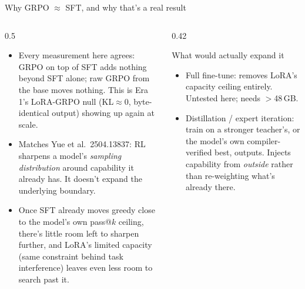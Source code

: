 \documentclass[aspectratio=169,10pt]{beamer}
\begin{document}
\begin{frame}{Why GRPO $\approx$ SFT, and why that's a real result}
  \begin{columns}[T]
    \begin{column}{0.5\textwidth}
      \small
      \begin{itemize}\itemsep0.6em
        \item Every measurement here agrees: GRPO on top of SFT adds nothing beyond SFT alone; raw GRPO from the base moves nothing. This is Era 1's LoRA-GRPO null (KL$\approx$0, byte-identical output) showing up again at scale.
        \item Matches Yue et al.\ 2504.13837: RL sharpens a model's \emph{sampling distribution} around capability it already has. It doesn't expand the underlying boundary.
        \item Once SFT already moves greedy close to the model's own pass@$k$ ceiling, there's little room left to sharpen further, and LoRA's limited capacity (same constraint behind task interference) leaves even less room to search past it.
      \end{itemize}
    \end{column}
    \begin{column}{0.42\textwidth}
      \begin{block}{What would actually expand it}
        \small
        \begin{itemize}\itemsep0.4em
          \item Full fine-tune: removes LoRA's capacity ceiling entirely. Untested here; needs $>$48\,GB.
          \item Distillation / expert iteration: train on a stronger teacher's, or the model's own compiler-verified best, outputs. Injects capability from \emph{outside} rather than re-weighting what's already there.
        \end{itemize}
      \end{block}
    \end{column}
  \end{columns}
\end{frame}
\end{document}
